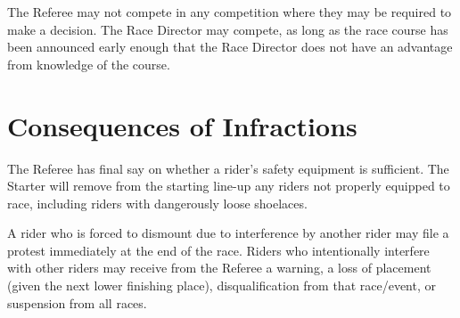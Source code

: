 The Referee may not compete in any competition where they may be required to make a decision.
The Race Director may compete, as long as the race course has been announced early enough that the Race Director does not have an advantage from knowledge of the course.

\section{Consequences of Infractions}

The Referee has final say on whether a rider's safety equipment is sufficient. 
The Starter will remove from the starting line-up any riders not properly equipped to race, including riders with dangerously loose shoelaces.

A rider who is forced to dismount due to interference by another rider may file a protest immediately at the end of the race.
Riders who intentionally interfere with other riders may receive from the Referee a warning, a loss of placement (given the next lower finishing place), disqualification from that race/event, or suspension from all races.
